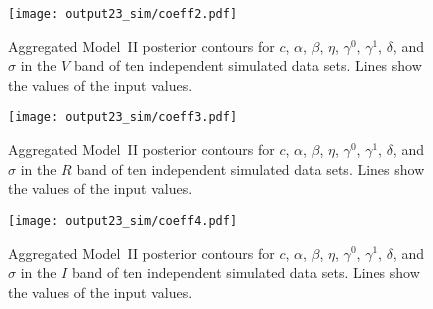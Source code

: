 \documentclass{aastex61}   	%
\begin{document}
\begin{figure}[htbp] %
   \centering
   \texttt{[image: output23\_sim/coeff2.pdf]} 
            \caption{Aggregated Model~II posterior contours for $c$, $\alpha$, $\beta$, $\eta$, $\gamma^0$, $\gamma^1$,  $\delta$, and $\sigma$ in the $V$ band of ten independent simulated data sets.   Lines show the values of the input values.
 \label{simglobal3:fig}}
\end{figure}

\begin{figure}[htbp] %
   \centering
      \texttt{[image: output23\_sim/coeff3.pdf]} 
            \caption{Aggregated Model~II posterior contours for $c$, $\alpha$, $\beta$, $\eta$, $\gamma^0$, $\gamma^1$,  $\delta$, and $\sigma$ in the $R$ band of ten independent simulated data sets.   Lines show the values of the input values.
\label{simglobal4:fig}}
\end{figure}

\begin{figure}[htbp] %
   \centering
         \texttt{[image: output23\_sim/coeff4.pdf]} 
            \caption{Aggregated Model~II posterior contours for $c$, $\alpha$, $\beta$, $\eta$, $\gamma^0$, $\gamma^1$,  $\delta$, and $\sigma$ in the $I$ band of ten independent simulated data sets.   Lines show the values of the input values.
 \label{simglobal5:fig}}
\end{figure}
\end{document}
